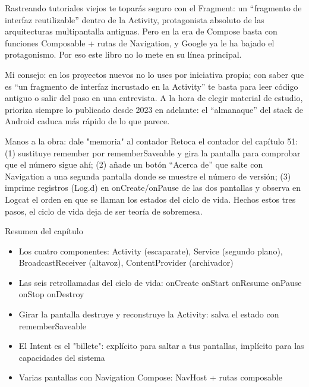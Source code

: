 
Rastreando tutoriales viejos te toparás seguro con el Fragment: un “fragmento de interfaz reutilizable” dentro de la Activity, protagonista absoluto de las arquitecturas multipantalla antiguas. Pero en la era de Compose basta con funciones Composable + rutas de Navigation, y Google ya le ha bajado el protagonismo. Por eso este libro no lo mete en su línea principal.

Mi consejo: en los proyectos nuevos no lo uses por iniciativa propia; con saber que es “un fragmento de interfaz incrustado en la Activity” te basta para leer código antiguo o salir del paso en una entrevista. A la hora de elegir material de estudio, prioriza siempre lo publicado desde 2023 en adelante: el “almanaque” del stack de Android caduca más rápido de lo que parece.

\begin{tcbpractice}{Manos a la obra: dale "memoria" al contador}
Retoca el contador del capítulo 51: (1) sustituye remember por rememberSaveable y gira la pantalla para comprobar que el número sigue ahí; (2) añade un botón “Acerca de” que salte con Navigation a una segunda pantalla donde se muestre el número de versión; (3) imprime registros (Log.d) en onCreate/onPause de las dos pantallas y observa en Logcat el orden en que se llaman los estados del ciclo de vida. Hechos estos tres pasos, el ciclo de vida deja de ser teoría de sobremesa.

\end{tcbpractice}

\begin{tcbsummary}{Resumen del capítulo}
\begin{itemize}
  \item Los cuatro componentes: Activity (escaparate), Service (segundo plano), BroadcastReceiver (altavoz), ContentProvider (archivador)
  \item Las seis retrollamadas del ciclo de vida: onCreate onStart onResume onPause onStop onDestroy
  \item Girar la pantalla destruye y reconstruye la Activity: salva el estado con rememberSaveable
  \item El Intent es el "billete": explícito para saltar a tus pantallas, implícito para las capacidades del sistema
  \item Varias pantallas con Navigation Compose: NavHost + rutas composable
\end{itemize}

\end{tcbsummary}
